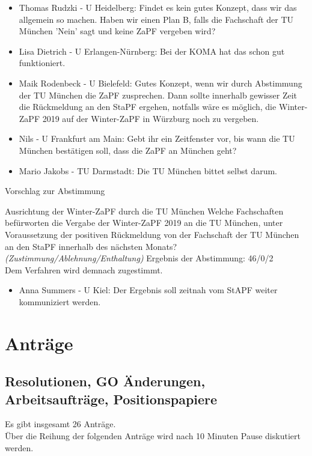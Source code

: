     \begin{itemize}
      \item Thomas Rudzki - U Heidelberg: Findet es kein gutes Konzept, dass wir das allgemein so machen. Haben wir einen Plan B, falls die Fachschaft der TU München 'Nein' sagt und keine ZaPF vergeben wird?
      \item Lisa Dietrich - U Erlangen-Nürnberg: Bei der KOMA hat das schon gut funktioniert.
      \item Maik Rodenbeck - U Bielefeld: Gutes Konzept, wenn wir durch Abstimmung der TU München die ZaPF zusprechen. Dann sollte innerhalb gewisser Zeit die Rückmeldung an den StaPF ergehen, notfalls wäre es möglich, die Winter-ZaPF 2019 auf der Winter-ZaPF in Würzburg noch zu vergeben.
      \item  Nils - U Frankfurt am Main: Gebt ihr ein Zeitfenster vor, bis wann die TU München bestätigen soll, dass die ZaPF an München geht?
      \item Mario Jakobs - TU Darmstadt: Die TU München bittet selbst darum.
    \end{itemize}
    Vorschlag zur Abstimmung

    \begin{success}{Ausrichtung der Winter-ZaPF durch die TU München}
      Welche Fachschaften befürworten die Vergabe der Winter-ZaPF 2019 an die TU München, unter Voraussetzung der positiven Rückmeldung von der Fachschaft der TU München an den StaPF innerhalb des nächsten Monats? \textit{(Zustimmung/Ablehnung/Enthaltung)}
      \tcblower
      Ergebnis der Abstimmung: 46/0/2 \\
      Dem Verfahren wird demnach zugestimmt.
    \end{success}

    \begin{itemize}
      \item Anna Summers - U Kiel: Der Ergebnis soll zeitnah vom StAPF weiter kommuniziert werden.
    \end{itemize}

\section{Anträge}
  \subsection{Resolutionen, GO Änderungen, Arbeitsaufträge, Positionspapiere}
    Es gibt insgesamt 26 Anträge. \\
    Über die Reihung der folgenden Anträge wird nach 10 Minuten Pause diskutiert werden.

